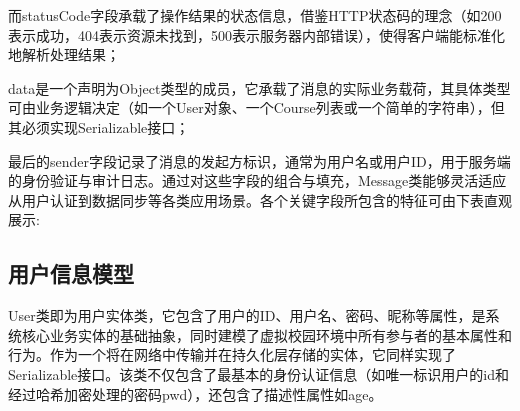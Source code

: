而statusCode字段承载了操作结果的状态信息，借鉴HTTP状态码的理念（如200表示成功，404表示资源未找到，500表示服务器内部错误），使得客户端能标准化地解析处理结果；

data是一个声明为Object类型的成员，它承载了消息的实际业务载荷，其具体类型可由业务逻辑决定（如一个User对象、一个Course列表或一个简单的字符串），但其必须实现Serializable接口；

最后的sender字段记录了消息的发起方标识，通常为用户名或用户ID，用于服务端的身份验证与审计日志。通过对这些字段的组合与填充，Message类能够灵活适应从用户认证到数据同步等各类应用场景。各个关键字段所包含的特征可由下表直观展示:
\begin{table}[H]
        \centering
    \end{table}
\subsection{用户信息模型}
User类即为用户实体类，它包含了用户的ID、用户名、密码、昵称等属性，是系统核心业务实体的基础抽象，同时建模了虚拟校园环境中所有参与者的基本属性和行为。作为一个将在网络中传输并在持久化层存储的实体，它同样实现了Serializable接口。该类不仅包含了最基本的身份认证信息（如唯一标识用户的id和经过哈希加密处理的密码pwd），还包含了描述性属性如age。

